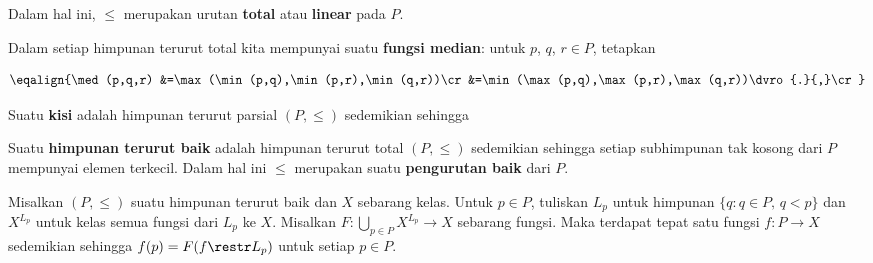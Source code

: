 \noindent Dalam hal ini, $\le$ merupakan urutan {\bf total} atau {\bf linear}
pada $P$.

Dalam setiap himpunan terurut total kita mempunyai suatu {\bf fungsi median}:
untuk $p$, $q$, $r\in P$, tetapkan

$$\eqalign{\med(p,q,r)
&=\max(\min(p,q),\min(p,r),\min(q,r))\cr
&=\min(\max(p,q),\max(p,r),\max(q,r))\dvro{.}{,}\cr}$$


 Suatu {\bf kisi} adalah himpunan terurut parsial
$(P,\le)$ sedemikian sehingga


 Suatu {\bf himpunan terurut baik} adalah himpunan
terurut total $(P,\le)$ sedemikian sehingga setiap
subhimpunan tak kosong dari $P$ mempunyai elemen terkecil. Dalam hal ini
$\le$ merupakan suatu {\bf pengurutan baik} dari $P$.

 Misalkan $(P,\le)$ suatu himpunan
terurut baik dan $X$ sebarang kelas. Untuk $p\in P$, tuliskan $L_p$ untuk
himpunan $\{q:q\in P,\,q<p\}$ dan $X^{L_p}$ untuk kelas semua fungsi dari
$L_p$ ke $X$. Misalkan $F:\bigcup_{p\in P}X^{L_p}\to X$ sebarang fungsi.
Maka terdapat tepat satu fungsi $f:P\to X$ sedemikian sehingga
$f(p)=F(f\restr L_p)$ untuk setiap $p\in P$.

